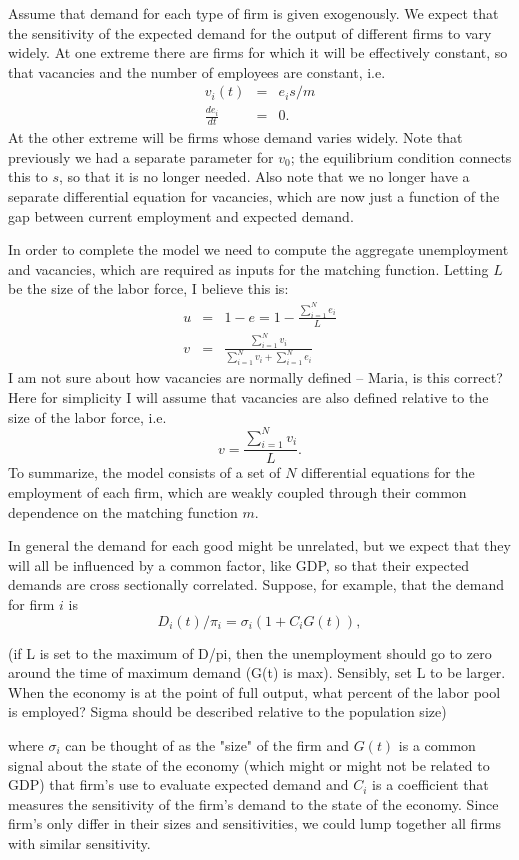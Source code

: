 Assume that demand for each type of firm is given exogenously.  We expect that the sensitivity of the expected demand for the output of different firms to vary widely.  At one extreme there are firms for which it will be effectively constant, so that vacancies and the number of employees are constant, i.e.
\begin{eqnarray}
v_i (t) & = & e_i s/m\\
\frac{de_i}{dt} & = & 0.
\end{eqnarray}
At the other extreme will be firms whose demand varies widely.  Note that previously we had a separate parameter for $v_0$; the equilibrium condition connects this to $s$, so that it is no longer needed.  Also note that we no longer have a separate differential equation for vacancies, which are now just a function of the gap between current employment and expected demand.

In order to complete the model we need to compute the aggregate unemployment and vacancies, which are required as inputs for the matching function.  Letting $L$ be the size of the labor force, I believe this is:
\begin{eqnarray}
u  & = & 1 - e = 1 - \frac{\sum_{i=1}^N e_{i}}{L}\\
v & = &  \frac{\sum_{i=1}^N v_{i}}{\sum_{i=1}^N v_{i} + \sum_{i=1}^N e_{i}}
\end{eqnarray}
I am not sure about how vacancies are normally defined -- Maria, is this correct?  Here for simplicity I will assume that vacancies are also defined relative to the size of the labor force, i.e.
\begin{equation}
v =  \frac{\sum_{i=1}^N v_{i}}{L}.
\end{equation}
To summarize, the model consists of a set of $N$ differential equations for the employment of each firm, which are weakly coupled through their common dependence on the matching function $m$.

 In general the demand for each good might be unrelated, but we expect that they will all be influenced by a common factor, like GDP, so that their expected demands are cross sectionally correlated. Suppose, for example, that the demand for firm $i$ is 
\begin{equation}
D_i (t)/\pi_i = \sigma_i (1 + C_i G(t)),
\end{equation}

(if L is set to the maximum of D/pi, then the unemployment should go to zero around the time of maximum demand (G(t) is max). Sensibly, set L to be larger. When the economy is at the point of full output, what percent of the labor pool is employed? Sigma should be described relative to the population size)

where $\sigma_i$ can be thought of as the "size" of the firm and $G(t)$ is a common signal about the state of the economy (which might or might not be related to GDP) that firm's use to evaluate expected demand  and $C_i$ is a coefficient that measures the sensitivity of the firm's demand to the state of the economy.  Since firm's only differ in their sizes and sensitivities, we could lump together all firms with similar sensitivity.